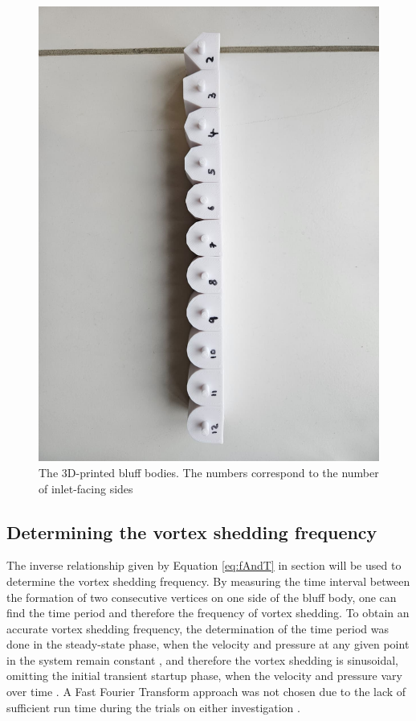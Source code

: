 \begin{figure}[H]
	\centering
	\includegraphics[width=\textwidth]{images/shapes.jpg}
	\caption{The 3D-printed bluff bodies. The numbers correspond to the number of inlet-facing sides}
	\label{fig:shapes}
\end{figure}


\subsection{Determining the vortex shedding frequency}
The inverse relationship given by Equation \eqref{eq:fAndT} in section  will be used to determine the vortex shedding frequency. By measuring the time interval between the formation of two consecutive vertices on one side of the bluff body, one can find the time period and therefore the frequency of vortex shedding. To obtain an accurate vortex shedding frequency, the determination of the time period was done in the steady-state phase, when the velocity and pressure at any given point in the system remain constant \parencite{noauthor_steady_nodate}, and therefore the vortex shedding is sinusoidal, omitting the initial transient startup phase, when the velocity and pressure vary over time \parencite{noauthor_transient_nodate}. A Fast Fourier Transform approach was not chosen due to the lack of sufficient run time during the trials on either investigation \parencites[10--11]{shi2025vortex}[12]{xu_experimental_2025}.

